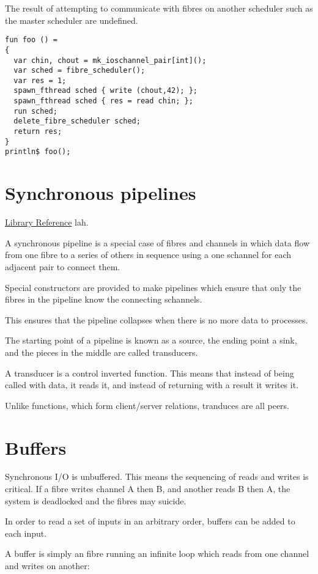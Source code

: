 \documentclass[oneside]{book}
\begin{document}
{The result of attempting to communicate with fibres on another
scheduler such as the master scheduler are undefined.

\begin{verbatim}
fun foo () = 
{
  var chin, chout = mk_ioschannel_pair[int]();
  var sched = fibre_scheduler();
  var res = 1;
  spawn_fthread sched { write (chout,42); };
  spawn_fthread sched { res = read chin; };
  run sched;
  delete_fibre_scheduler sched; 
  return res;
}
println$ foo();
\end{verbatim}

\section{Synchronous pipelines}
\href{http://felix-lang.org/share/lib/std/control/spipes.flx}{Library Reference}
lah.

A synchronous pipeline is a special case of fibres and channels
in which data flow from one fibre to a series of others in sequence
using a one schannel for each adjacent pair to connect them.

Special constructors are provided to make pipelines which ensure
that only the fibres in the pipeline know the connecting schannels.

This ensures that the pipeline collapses when there is no more
data to processes.

The starting point of a pipeline is known as a source,
the ending point a sink, and the pieces in the middle
are called transducers.

A transducer is a control inverted function. This means that
instead of being called with data, it reads it, and instead
of returning with a result it writes it.

Unlike functions, which form client/server relations,
tranduces are all peers.

\section{Buffers}
Synchronous I/O is unbuffered. This means the sequencing of reads
and writes is critical. If a fibre writes channel A then B, and another
reads B then A, the system is deadlocked and the fibres may suicide.

In order to read a set of inputs in an arbitrary order, buffers can
be added to each input.

A buffer is simply an fibre running an infinite loop which reads from one
channel and writes on another:

}
\end{document}
